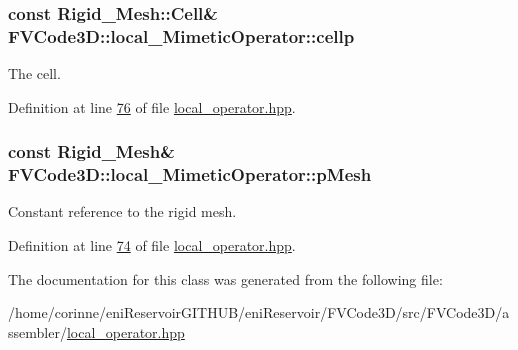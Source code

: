 \subsubsection[{\texorpdfstring{cellp}{cellp}}]{\setlength{\rightskip}{0pt plus 5cm}const {\bf Rigid\+\_\+\+Mesh\+::\+Cell}\& F\+V\+Code3\+D\+::local\+\_\+\+Mimetic\+Operator\+::cellp\hspace{0.3cm}{\ttfamily [protected]}}\hypertarget{classFVCode3D_1_1local__MimeticOperator_a771437af467a250d8bcaf1d06372ae8e}{}\label{classFVCode3D_1_1local__MimeticOperator_a771437af467a250d8bcaf1d06372ae8e}


The cell. 



Definition at line \hyperlink{local__operator_8hpp_source_l00076}{76} of file \hyperlink{local__operator_8hpp_source}{local\+\_\+operator.\+hpp}.

\subsubsection[{\texorpdfstring{p\+Mesh}{pMesh}}]{\setlength{\rightskip}{0pt plus 5cm}const {\bf Rigid\+\_\+\+Mesh}\& F\+V\+Code3\+D\+::local\+\_\+\+Mimetic\+Operator\+::p\+Mesh\hspace{0.3cm}{\ttfamily [protected]}}\hypertarget{classFVCode3D_1_1local__MimeticOperator_aaedb6f563c6c3c28afadc1d3725b3f71}{}\label{classFVCode3D_1_1local__MimeticOperator_aaedb6f563c6c3c28afadc1d3725b3f71}


Constant reference to the rigid mesh. 



Definition at line \hyperlink{local__operator_8hpp_source_l00074}{74} of file \hyperlink{local__operator_8hpp_source}{local\+\_\+operator.\+hpp}.



The documentation for this class was generated from the following file\+:\begin{DoxyCompactItemize}
\item 
/home/corinne/eni\+Reservoir\+G\+I\+T\+H\+U\+B/eni\+Reservoir/\+F\+V\+Code3\+D/src/\+F\+V\+Code3\+D/assembler/\hyperlink{local__operator_8hpp}{local\+\_\+operator.\+hpp}\end{DoxyCompactItemize}
